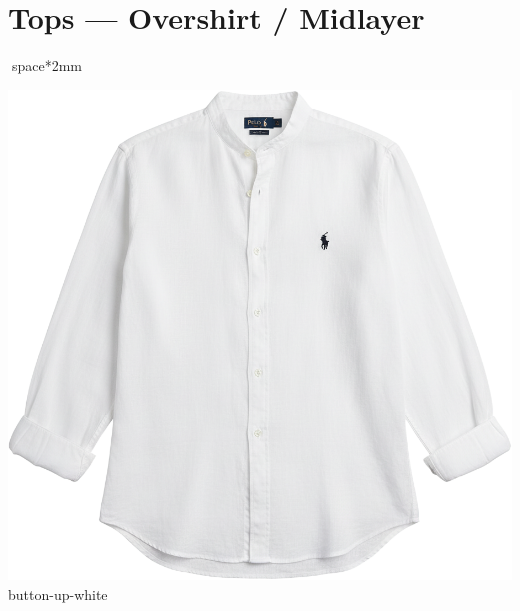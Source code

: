 \documentclass[10pt]{article}
\begin{document}
\section*{Tops — Overshirt / Midlayer}space*{2mm}
\begin{minipage}[t]{0.22\textwidth}\centering\vspace{0mm}
\includegraphics[width=\linewidth,keepaspectratio]{assets/midlayer/button-up-white.png}\\
\vspace{0.5mm}\tiny button-up-white\end{minipage}
\end{document}
